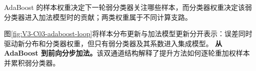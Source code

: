 \documentclass[UTF8,a4paper,11pt,openany]{ctexbook}
\begin{document}
\setcounter{page}{393}
\setcounter{chapter}{19}
\setcounter{figure}{0}
\pagestyle{headings}
\begin{geometrybox}
AdaBoost 的样本权重决定下一轮弱分类器关注哪些样本，而分类器权重决定该弱分类器进入加法模型时的贡献；两类权重属于不同计算支路。
\end{geometrybox}

图\ref{fig:V3-C03-adaboost-loop}将样本分布更新与加法模型更新分开表示：误差同时驱动新分布和分类器权重，但只有弱分类器及其系数进入集成模型。
\textbf{从 AdaBoost 到前向分步加法。}该双通道结构解释了提升方法如何逐轮重加权样本并累积弱分类器。
\end{document}

